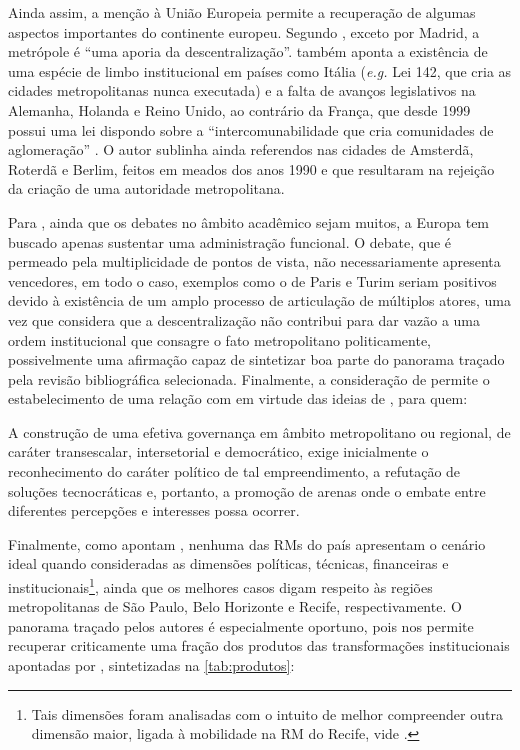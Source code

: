 \documentclass[
article,			%
11pt,				%
oneside,			%
a4paper,			%
english,			%
brazil,				%
sumario=tradicional
]{abntex2}
\begin{document}
	Ainda assim, a menção à União Europeia permite a recuperação de algumas aspectos importantes do continente europeu. Segundo , exceto por Madrid, a metrópole é ``uma aporia da descentralização''.  também aponta a existência de uma espécie de limbo institucional em países como Itália (\textit{e.g.} Lei 142, que cria as cidades metropolitanas nunca executada) e a falta de avanços legislativos na Alemanha, Holanda e Reino Unido, ao contrário da França, que desde 1999 possui uma lei dispondo sobre a ``intercomunabilidade que cria comunidades de aglomeração'' \cite[p. 301]{klink2009a}. O autor sublinha ainda referendos nas cidades de Amsterdã, Roterdã e Berlim, feitos em meados dos anos 1990 e que resultaram na rejeição da criação de uma autoridade metropolitana.
	
	Para , ainda que os debates no âmbito acadêmico sejam muitos, a Europa tem buscado apenas sustentar uma administração funcional. O debate, que é permeado pela multiplicidade de pontos de vista, não necessariamente apresenta vencedores, em todo o caso, exemplos como o de Paris e Turim seriam positivos devido à existência de um amplo processo de articulação de múltiplos atores, uma vez que considera que a descentralização não contribui para dar vazão a uma ordem institucional que consagre o fato metropolitano politicamente, possivelmente uma afirmação capaz de sintetizar boa parte do panorama traçado pela revisão bibliográfica selecionada. Finalmente, a consideração de  permite o estabelecimento de uma relação com  em virtude das ideias de , para quem:
	
	\begin{citacao}
		A construção de uma efetiva governança em âmbito metropolitano ou regional, de caráter transescalar, intersetorial e democrático, exige inicialmente o reconhecimento do caráter político de tal empreendimento, a refutação de soluções tecnocráticas e, portanto, a promoção de arenas onde o embate entre diferentes percepções e interesses possa ocorrer.
	\end{citacao}
	
	Finalmente, como apontam , nenhuma das RMs do país apresentam o cenário ideal quando consideradas as dimensões políticas, técnicas, financeiras e institucionais\footnote{Tais dimensões foram analisadas com o intuito de melhor compreender outra dimensão maior, ligada à mobilidade na RM do Recife, vide .}, ainda que os melhores casos digam respeito às regiões metropolitanas de São Paulo, Belo Horizonte e Recife, respectivamente. O panorama traçado pelos autores é especialmente oportuno, pois nos permite recuperar criticamente uma fração dos produtos das transformações institucionais apontadas por , sintetizadas na \autoref{tab:produtos}:
	
\end{document}

